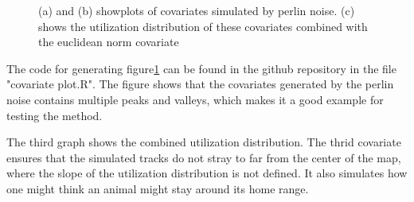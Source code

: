 \begin{figure}[H]%
    \centering
    \qquad
    \qquad
    \caption{(a) and (b) showplots of covariates simulated by perlin noise. (c) shows the utilization distribution of these covariates combined with the euclidean norm covariate}%
    \label{fig:covariate plots}%
\end{figure}


The code for generating figure\ref{fig:covariate plots} can be found in the github repository in the file "covariate plot.R". The figure shows that the covariates generated by the perlin noise contains multiple peaks and valleys, which makes it a good example for testing the method.

The third graph shows the combined utilization distribution. The thrid covariate ensures that the simulated tracks do not stray to far from the center of the map, where the slope of the utilization distribution is not defined. It also simulates how one might think an animal might stay around its home range. 

